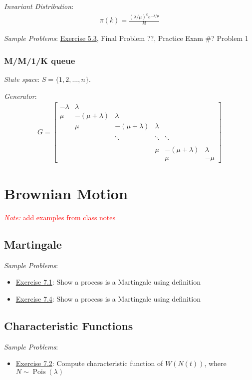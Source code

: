 \documentclass[12pt]{article}
\newcommand{\note}[1]{\textcolor{red}{\textit{Note:} #1}}
\begin{document}
\textit{Invariant Distribution}:
\begin{align*}
    \pi(k) = \frac{(\lambda/\mu)^ke^{-\lambda/\mu}}{k!}
\end{align*}


\textit{Sample Problems}: \hyperref[Exercise 5.3]{Exercise 5.3}, Final Problem ??, Practice Exam \#? Problem 1


\subsubsection{M/M/1/K queue}

\textit{State space}: \( S = \{1,2,\ldots, n\} \).

\textit{Generator}:
\begin{align*}
    G = \left[\begin{array}{cccccc}
        -\lambda & \lambda \\
        \mu & -(\mu+\lambda) & \lambda \\
        & \mu & -(\mu+\lambda) & \lambda \\
        \\
        && \ddots & \ddots & \ddots \\
        \\
        &&& \mu & -(\mu+\lambda) & \lambda \\
        &&&& \mu & -\mu
    \end{array}\right]
\end{align*}


\pagebreak
\section{Brownian Motion}
\note{add examples from class notes}

\subsection{Martingale}
\textit{Sample Problems}: 
\begin{itemize}[nolistsep]
    \item \hyperref[Exercise 7.1]{Exercise 7.1}: Show a process is a Martingale using definition
    \item \hyperref[Exercise 7.4]{Exercise 7.4}: Show a process is a Martingale using definition
\end{itemize}

\subsection{Characteristic Functions}
\textit{Sample Problems}: 
\begin{itemize}[nolistsep]
    \item \hyperref[Exercise 7.2]{Exercise 7.2}: Compute characteristic function of \( W(N(t)) \), where \( N\sim \operatorname{Pois}(\lambda) \)
\end{itemize}
\end{document}
